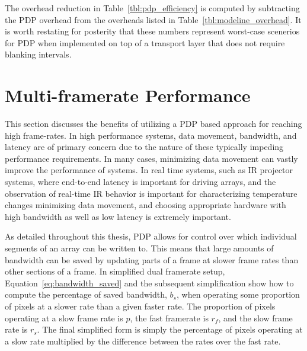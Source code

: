     The overhead reduction in Table~\ref{tbl:pdp_efficiency} is computed by subtracting the PDP overhead from the overheads listed in Table~\ref{tbl:modeline_overhead}. It is worth restating for posterity that these numbers represent worst-case scenerios for PDP when implemented on top of a transport layer that does not require blanking intervals.

\section{Multi-framerate Performance}
    \label{sec:multi_framerate_performance}

    This section discusses the benefits of utilizing a PDP based approach for reaching high frame-rates. In high performance systems, data movement\cite{LeeEtAl1984}, bandwidth\cite{LaiBaker1999}, and latency\cite{ZhengEtAl2014} are of primary concern due to the nature of these typically impeding performance requirements. In many cases, minimizing data movement can vastly improve the performance of systems\cite{BandyopadhyayCoyle2004,LiEtAl2009,Hall2020}. In real time systems\cite{Kopetz2011}, such as IR projector systems, where end-to-end latency is important for driving arrays, and the observation of real-time IR behavior is important for characterizing temperature changes\cite{ZhouEtAl2000} minimizing data movement, and choosing appropriate hardware with high bandwidth as well as low latency is extremely important.

    As detailed throughout this thesis, PDP allows for control over which individual segments of an array can be written to. This means that large amounts of bandwidth can be saved by updating parts of a frame at slower frame rates than other sections of a frame. In simplified dual framerate setup, Equation~\eqref{eq:bandwidth_saved} and the subsequent simplification show how to compute the percentage of saved bandwidth, $b_s$, when operating some proportion of pixels at a slower rate than a given faster rate. The proportion of pixels operating at a slow frame rate is $p$, the fast framerate is $r_f$, and the slow frame rate is $r_s$. The final simplified form is simply the percentage of pixels operating at a slow rate multiplied by the difference between the rates over the fast rate.

